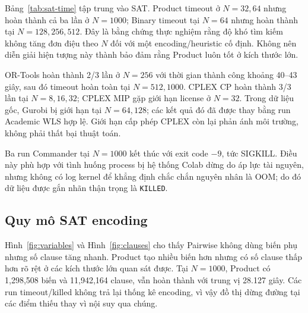 \documentclass[a4paper,fleqn]{cas-sc}
\providecommand{\ReportPrefix}{}
\begin{document}
\begin{table}[htbp]
  \centering
  \caption{Trung vị thời gian theo giây của các run thành công; trong ngoặc
  là số run thành công/tổng số run. TO: toàn bộ run timeout; dấu gạch ngang:
  không chạy.}
  \label{tab:gurobi-comparison}
  \resizebox{\textwidth}{!}{}
\end{table}

Bảng~\ref{tab:sat-time} tập trung vào SAT. Product timeout ở $N=32,64$ nhưng
hoàn thành cả ba lần ở $N=1000$; Binary timeout tại $N=64$ nhưng hoàn thành tại
$N=128,256,512$. Đây là bằng chứng thực nghiệm rằng độ khó tìm kiếm không tăng
đơn điệu theo $N$ đối với một encoding/heuristic cố định. Không nên diễn giải
hiện tượng này thành bảo đảm rằng Product luôn tốt ở kích thước lớn.

\begin{table}[htbp]
  \centering
  \caption{Thời gian trung vị SAT theo giây; trong ngoặc là số run thành
  công/tổng số run. TO: timeout; KILL: SIGKILL; ``--'': không chạy.}
  \label{tab:sat-time}
  \resizebox{\textwidth}{!}{}
\end{table}

OR-Tools hoàn thành 2/3 lần ở $N=256$ với thời gian thành công khoảng
40--43 giây, sau đó timeout hoàn toàn tại $N=512,1000$. CPLEX CP hoàn thành
3/3 lần tại $N=8,16,32$; CPLEX MIP gặp giới hạn license ở $N=32$. Trong dữ
liệu gốc, Gurobi bị giới hạn tại $N=64,128$; các kết quả đó đã được thay bằng
run Academic WLS hợp lệ. Giới hạn cấp phép CPLEX còn lại phản ánh môi trường,
không phải thất bại thuật toán.

Ba run Commander tại $N=1000$ kết thúc với exit code $-9$, tức SIGKILL. Điều
này phù hợp với tình huống process bị hệ thống Colab dừng do áp lực tài nguyên,
nhưng không có log kernel để khẳng định chắc chắn nguyên nhân là OOM; do đó dữ
liệu được gắn nhãn thận trọng là \texttt{KILLED}.

\subsection{Quy mô SAT encoding}

Hình~\ref{fig:variables} và Hình~\ref{fig:clauses} cho thấy Pairwise không dùng
biến phụ nhưng số clause tăng nhanh. Product tạo nhiều biến hơn nhưng có số
clause thấp hơn rõ rệt ở các kích thước lớn quan sát được. Tại $N=1000$,
Product có 1,298,508 biến và 11,942,164 clause, vẫn hoàn thành với trung vị
28.127 giây. Các run timeout/killed không trả lại thống kê encoding, vì vậy
đồ thị dừng đường tại các điểm thiếu thay vì nội suy qua chúng.
\end{document}
